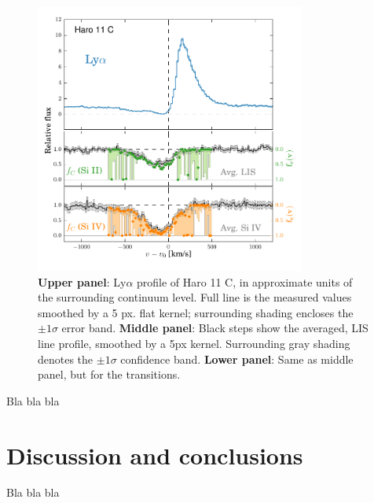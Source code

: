 \documentclass[preprint2]{aastex6}
\begin{document}
\begin{figure}
\centering
\includegraphics[width=3.500in]{../Figs/LyACoverfracs.pdf}
\caption{\textbf{Upper panel}: Ly$\alpha$ profile of Haro 11 C, in
approximate units of the surrounding continuum level. Full line is the
measured values smoothed by a 5 px. flat kernel; surrounding shading
encloses the $\pm 1 \sigma$ error band. \textbf{Middle panel}: Black
steps show the averaged, LIS line profile, smoothed by a 5px kernel.
Surrounding gray shading denotes the $\pm 1 \sigma$ confidence band.
\textbf{Lower panel}: Same as middle panel, but for the 
transitions.}\label{fig:HisLisLya}
\end{figure}

Bla bla bla

\section{Discussion and conclusions}\label{discussion-and-conclusions}

Bla bla bla


\end{document}
